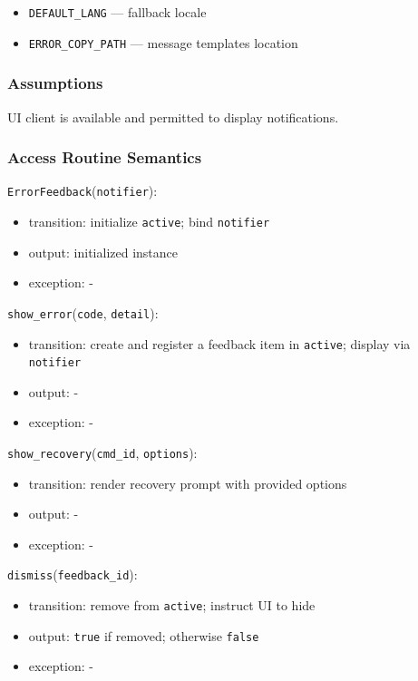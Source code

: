 \documentclass[12pt, titlepage]{article}
\begin{document}
\begin{itemize}
  \item \texttt{DEFAULT\_LANG} — fallback locale
  \item \texttt{ERROR\_COPY\_PATH} — message templates location
\end{itemize}

\subsubsection{Assumptions}

UI client is available and permitted to display notifications.

\subsubsection{Access Routine Semantics}

\noindent \texttt{ErrorFeedback}(\texttt{notifier}):
\begin{itemize}
\item transition: initialize \texttt{active}; bind \texttt{notifier}
\item output: initialized instance
\item exception: -
\end{itemize}

\noindent \texttt{show\_error}(\texttt{code}, \texttt{detail}):
\begin{itemize}
\item transition: create and register a feedback item in \texttt{active}; display via \texttt{notifier}
\item output: -
\item exception: -
\end{itemize}

\noindent \texttt{show\_recovery}(\texttt{cmd\_id}, \texttt{options}):
\begin{itemize}
\item transition: render recovery prompt with provided options
\item output: -
\item exception: -
\end{itemize}

\noindent \texttt{dismiss}(\texttt{feedback\_id}):
\begin{itemize}
\item transition: remove from \texttt{active}; instruct UI to hide
\item output: \texttt{true} if removed; otherwise \texttt{false}
\item exception: -
\end{itemize}
\end{document}
